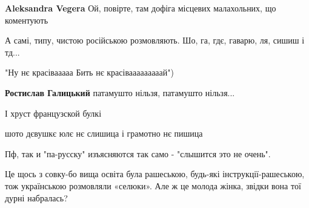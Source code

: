 \begin{itemize}
\begin{itemize}
\textbf{Aleksandra Vegera} Ой, повірте, там дофіга місцевих малахольних, що коментують
\end{itemize}

 
А самі, типу, чистою російською розмовляють. Шо, га, гдє, гаварю, ля, сишиш і тд...

 
"Ну нє красівааааа
Бить нє красівааааааааай")

\begin{itemize}
 
\textbf{Ростислав Галицький} патамушто нільзя, патамушто нільзя...

 
І хруст французской булкі
\end{itemize}

 

шото дєвушкє юлє нє слишица і грамотно нє пишица

 
Пф, так и "па-русску" изъясняются так само - "слышится это не очень".

 

Це щось з совку-бо вища освіта була рашеською, будь-які інструкції-рашеською, тож
українською розмовляли «селюки». Але ж це молода жінка, звідки вона тої дурні
набралась?

\end{itemize}

